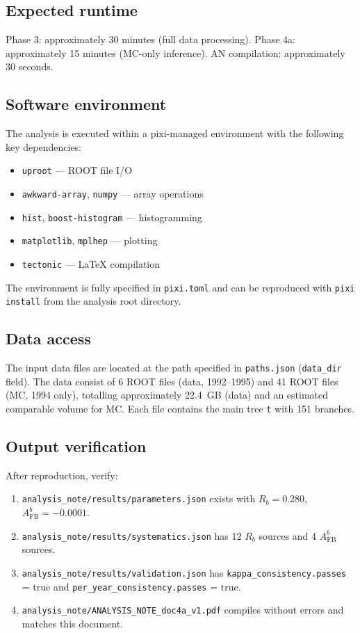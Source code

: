\documentclass[11pt,a4paper]{article}
\begin{document}
\subsection{Expected runtime}

Phase 3: approximately 30 minutes (full data processing).
Phase 4a: approximately 15 minutes (MC-only inference).
AN compilation: approximately 30 seconds.

\subsection{Software environment}

The analysis is executed within a pixi-managed environment with the following key
dependencies:
\begin{itemize}
\item \texttt{uproot} --- ROOT file I/O
\item \texttt{awkward-array}, \texttt{numpy} --- array operations
\item \texttt{hist}, \texttt{boost-histogram} --- histogramming
\item \texttt{matplotlib}, \texttt{mplhep} --- plotting
\item \texttt{tectonic} --- LaTeX compilation
\end{itemize}

The environment is fully specified in \texttt{pixi.toml} and can be reproduced
with \texttt{pixi install} from the analysis root directory.

\subsection{Data access}

The input data files are located at the path specified in \texttt{paths.json}
(\texttt{data\_dir} field). The data consist of 6 ROOT files (data, 1992--1995)
and 41 ROOT files (MC, 1994 only), totalling approximately 22.4~GB (data) and
an estimated comparable volume for MC. Each file contains the main tree \texttt{t}
with 151 branches.

\subsection{Output verification}

After reproduction, verify:
\begin{enumerate}
\item \texttt{analysis\_note/results/parameters.json} exists with
$R_b = 0.280$, $A_\mathrm{FB}^b = -0.0001$.
\item \texttt{analysis\_note/results/systematics.json} has 12 $R_b$ sources
and 4 $A_\mathrm{FB}^b$ sources.
\item \texttt{analysis\_note/results/validation.json} has
\texttt{kappa\_consistency.passes} = true and
\texttt{per\_year\_consistency.passes} = true.
\item \texttt{analysis\_note/ANALYSIS\_NOTE\_doc4a\_v1.pdf} compiles without
errors and matches this document.
\end{enumerate}
\end{document}

